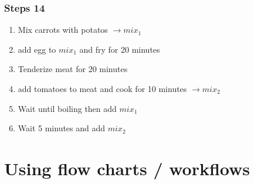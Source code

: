 \documentclass[letterpaper,10pt,english]{sphinxmanual}
\begin{document}
\subsection{Steps 1\sphinxhyphen{}4}
\label{\detokenize{01-Introduction:steps-1-4}}\begin{enumerate}
%
\item {} 
\sphinxAtStartPar
{} Mix carrots with potatos \(\rightarrow  mix_1\)

\item {} 
\sphinxAtStartPar
{} add egg to \(mix_1\) and fry for 20 minutes

\item {} 
\sphinxAtStartPar
{} Tenderize meat for 20 minutes

\item {} 
\sphinxAtStartPar
{} add tomatoes to meat and cook for 10 minutes \(\rightarrow mix_2\)

\item {} 
\sphinxAtStartPar
{} Wait until boiling then add \(mix_1\)

\item {} 
\sphinxAtStartPar
{} Wait 5 minutes and add \(mix_2\)

\end{enumerate}


\chapter{Using flow charts / workflows}
\label{\detokenize{01-Introduction:using-flow-charts-workflows}}
\end{document}
